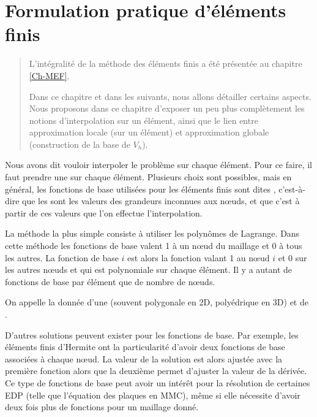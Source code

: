 \chapter{Formulation pratique d'éléments finis \pln}\label{Ch-Elts}
\begin{abstract}
L'intégralité de la méthode des éléments finis a été présentée au chapitre
\ref{Ch-MEF}.

Dans ce chapitre et dans les suivants, nous allons détailler certains aspects.
Nous proposons dans ce chapitre d'exposer un peu plus complètement les notions
d'interpolation sur un élément, ainsi que le lien entre approximation locale
(sur un élément) et approximation globale (construction de la base de $V_h$).
\end{abstract}


Nous avons dit vouloir interpoler le problème sur chaque élément.
Pour ce faire, il faut prendre une  sur chaque élément.
Plusieurs choix sont possibles, mais en général, les fonctions de base utilisées pour les 
éléments finis sont dites , c'est-à-dire que les 
 sont les valeurs des grandeurs inconnues aux nœuds,
et que c'est à partir de ces valeurs que l'on effectue l'interpolation.

\medskip
La méthode la plus simple consiste à utiliser les polynômes de Lagrange. 
Dans cette méthode les fonctions de base valent 1 à un nœud du maillage et 0 à tous les autres. 
La fonction de base $i$ est alors la fonction valant 1 au nœud $i$ et 0 sur les autres nœuds 
et qui est polynomiale sur chaque élément. 
Il y a autant de fonctions de base par élément que de nombre de nœuds.

On appelle  la donnée d'une  
(souvent polygonale en 2D, polyédrique en 3D) et de .

\medskip
D'autres solutions peuvent exister pour les fonctions de base. 
Par exemple, les éléments finis d'Hermite 
ont la particularité d'avoir deux fonctions de base associées à chaque nœud. 
La valeur de la solution est alors ajustée avec la première fonction alors que la deuxième 
permet d'ajuster la valeur de la dérivée. 
Ce type de fonctions de base peut avoir un intérêt pour la résolution de certaines EDP
(telle que l'équation des plaques en MMC), même si elle nécessite d'avoir deux fois plus 
de fonctions pour un maillage donné.








